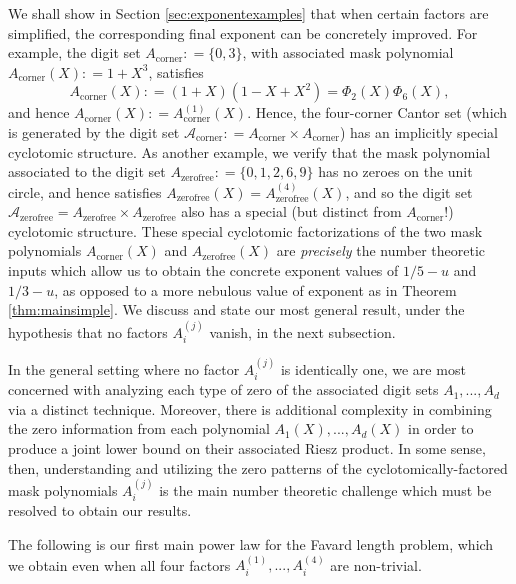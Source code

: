 \documentclass[12pt]{amsart}
\numberwithin{equation}{section}
\begin{document}
We shall show in Section \ref{sec:exponentexamples} that when certain factors are simplified, the corresponding final exponent can be concretely improved. For example, the digit set $A_{\text{corner}} : = \{0,3\}$, with associated mask polynomial $A_{\text{corner}}(X) : = 1 + X^3$, satisfies
$$
A_{\text{corner}} (X) : = (1 + X)(1 -X + X^2) = \Phi_2 (X) \Phi_6 (X),
$$
and hence $A_{\text{corner}} (X) : = A_{\text{corner}}^{(1)} (X)$. Hence, the four-corner Cantor set (which is generated by the digit set $\mathcal{A}_{\text{corner}} : = A_{\text{corner}} \times A_{\text{corner}}$) has an implicitly special cyclotomic structure. As another example, we verify that the mask polynomial associated to the digit set $A_{\text{zerofree}} : = \{0,1,2,6,9\}$ has no zeroes on the unit circle, and hence satisfies $A_{\text{zerofree}} (X) = A_{\text{zerofree}}^{(4)} (X)$, and so the digit set $\mathcal{A}_{\text{zerofree}} = A_{\text{zerofree}} \times A_{\text{zerofree}}$ also has a special (but distinct from $A_{\text{corner}}$!) cyclotomic structure. These special cyclotomic factorizations of the two mask polynomials $A_{\text{corner}}(X)$ and $A_{\text{zerofree}}(X)$ are \textit{precisely} the number theoretic inputs which allow us to obtain the concrete exponent values of $1/5 - u$ and $1/3 - u$, as opposed to a more nebulous value of exponent as in Theorem \ref{thm:mainsimple}. We discuss and state our most general result, under the hypothesis that no factors $A_i^{(j)}$ vanish, in the next subsection.

In the general setting where no factor $A_i^{(j)}$ is identically one, we are most concerned with analyzing each type of zero of the associated digit sets $A_1,...,A_d$ via a distinct technique. Moreover, there is additional complexity in combining the zero information from each polynomial $A_1(X),...,A_d(X)$ in order to produce a joint lower bound on their associated Riesz product. In some sense, then, understanding and utilizing the zero patterns of the cyclotomically-factored mask polynomials $A_i^{(j)}$ is the main number theoretic challenge which must be resolved to obtain our results.

The following is our first main power law for the Favard length problem, which we obtain even when all four factors $A_i^{(1)},...,A_i^{(4)}$ are non-trivial.
\end{document}
